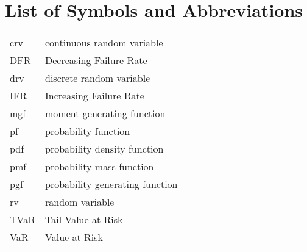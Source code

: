 \chapter{List of Symbols and Abbreviations}%
\label{chp:list_of_symbols_and_abbreviations}

\begin{longtable}{l l}
  crv  & continuous random variable \\
  DFR  & Decreasing Failure Rate \\
  drv  & discrete random variable \\
  IFR  & Increasing Failure Rate \\
  mgf  & moment generating function \\
  pf   & probability function \\
  pdf  & probability density function \\
  pmf  & probability mass function \\
  pgf  & probability generating function \\
  rv   & random variable \\
  TVaR & Tail-Value-at-Risk \\
  VaR  & Value-at-Risk
\end{longtable}


